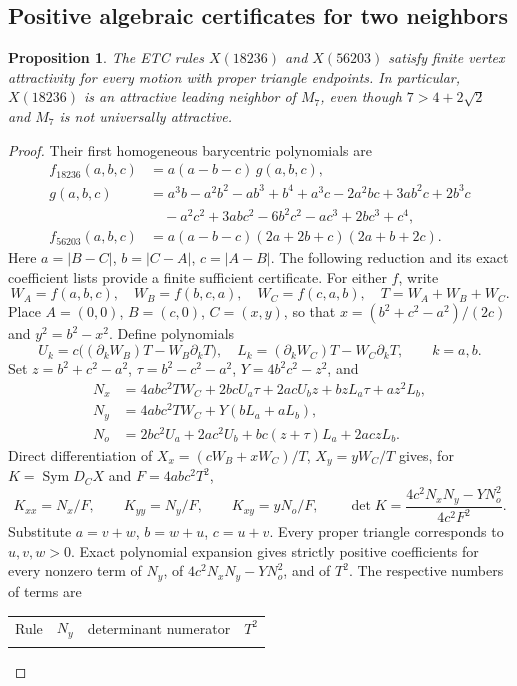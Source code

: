 \documentclass[11pt]{article}
\newtheorem{proposition}[theorem]{Proposition}
\theoremstyle{definition}
\newcommand{\Sym}{\operatorname{Sym}}
\newcommand{\toprule}{\noalign{\hrule height 0.8pt\vskip4pt}}
\newcommand{\midrule}{\noalign{\vskip3pt\hrule height 0.4pt\vskip3pt}}
\begin{document}
\subsection{Positive algebraic certificates for two neighbors}
\begin{proposition}\label{prop:neighbor-positive}
The ETC rules $X(18236)$ and $X(56203)$ satisfy finite vertex attractivity
for every motion with proper triangle endpoints. In particular,
$X(18236)$ is an attractive leading neighbor of $M_7$, even though
$7>4+2\sqrt2$ and $M_7$ is not universally attractive.
\end{proposition}
\begin{proof}
Their first homogeneous barycentric polynomials are
\begin{align*}
 f_{18236}(a,b,c)&=a(a-b-c)\,g(a,b,c),\\
 g(a,b,c)&=a^3b-a^2b^2-ab^3+b^4+a^3c-2a^2bc+3ab^2c+2b^3c\\
 &\quad-a^2c^2+3abc^2-6b^2c^2-ac^3+2bc^3+c^4,\\
 f_{56203}(a,b,c)&=a(a-b-c)(2a+2b+c)(2a+b+2c).
\end{align*}
Here $a=|B-C|$, $b=|C-A|$, $c=|A-B|$. The following reduction
and its exact coefficient lists provide a finite sufficient certificate.
For either $f$, write
\[
 W_A=f(a,b,c),\quad W_B=f(b,c,a),\quad W_C=f(c,a,b),\quad
 T=W_A+W_B+W_C.
\]
Place $A=(0,0)$, $B=(c,0)$, $C=(x,y)$, so that
$x=(b^2+c^2-a^2)/(2c)$ and $y^2=b^2-x^2$. Define polynomials
\[
 U_k=c\bigl((\partial_kW_B)T-W_B\partial_kT\bigr),\quad
 L_k=(\partial_kW_C)T-W_C\partial_kT,\qquad k=a,b.
\]
Set $z=b^2+c^2-a^2$, $\tau=b^2-c^2-a^2$,
$Y=4b^2c^2-z^2$, and
\begin{align*}
 N_x&=4abc^2TW_C+2bcU_a\tau+2acU_bz+ bzL_a\tau+az^2L_b,\\
 N_y&=4abc^2TW_C+Y(bL_a+aL_b),\\
 N_o&=2bc^2U_a+2ac^2U_b+bc(z+\tau)L_a+2aczL_b.
\end{align*}
Direct differentiation of
$X_x=(cW_B+xW_C)/T$, $X_y=yW_C/T$ gives, for
$K=\Sym D_CX$ and $F=4abc^2T^2$,
\[
 K_{xx}=N_x/F,\qquad K_{yy}=N_y/F,\qquad K_{xy}=yN_o/F,
 \qquad \det K=\frac{4c^2N_xN_y-YN_o^2}{4c^2F^2}.
\]
Substitute $a=v+w$, $b=w+u$, $c=u+v$. Every proper triangle
corresponds to $u,v,w>0$. Exact polynomial expansion gives strictly
positive coefficients for every nonzero term of $N_y$, of
$4c^2N_xN_y-YN_o^2$, and of $T^2$. The respective numbers of terms
are
\begin{center}
\begin{tabular}{lrrr}
\toprule Rule & $N_y$ & determinant numerator & $T^2$\\\midrule

\end{tabular}
\end{center}
\end{proof}
\end{document}
